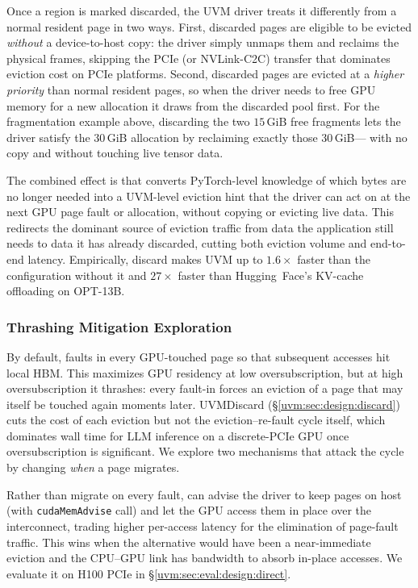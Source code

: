 Once a region is marked discarded,
    the UVM driver treats it differently from a normal resident page in two ways.
First, discarded pages are eligible to be evicted
    \emph{without} a device-to-host copy:
    the driver simply unmaps them and reclaims the physical frames,
    skipping the PCIe (or NVLink-C2C) transfer that dominates
    eviction cost on PCIe platforms.
Second, discarded pages are evicted at a \emph{higher priority}
    than normal resident pages,
    so when the driver needs to free GPU memory for a new allocation
    it draws from the discarded pool first.
For the fragmentation example above,
    discarding the two $15$\,GiB free fragments lets the driver
    satisfy the $30$\,GiB allocation by reclaiming exactly those $30$\,GiB---%
    with no copy and without touching live tensor data.

The combined effect is that {\uvmname} converts
    PyTorch-level knowledge of which bytes are no longer needed
    into a UVM-level eviction hint that the driver can act on
    at the next GPU page fault or allocation,
    without copying or evicting live data.
This redirects the dominant source of eviction traffic
    from data the application still needs
    to data it has already discarded,
    cutting both eviction volume and end-to-end latency.
Empirically, discard makes UVM up to 
    $1.6\times$ faster than the {\uvmname} configuration without it
    and $27\times$ faster than Hugging~Face's KV-cache offloading on OPT-13B.

\subsubsection{Thrashing Mitigation Exploration}
\label{uvm:sec:design:thrash}
By default, {\uvmname} faults in every GPU-touched page so that subsequent accesses hit local HBM.
This maximizes GPU residency at low oversubscription,
    but at high oversubscription it thrashes:
    every fault-in forces an eviction of a page that may itself be touched again moments later.
UVMDiscard (\S\ref{uvm:sec:design:discard}) cuts the cost of each eviction
    but not the eviction--re-fault cycle itself,
    which dominates wall time for LLM inference on a discrete-PCIe GPU once oversubscription is significant.
We explore two mechanisms that attack the cycle by changing \emph{when} a page migrates.

Rather than migrate on every fault,
    {\uvmname} can advise the driver to keep pages on host
    (with \texttt{cudaMemAdvise} call)
    and let the GPU access them in place over the interconnect,
    trading higher per-access latency for the elimination of page-fault traffic.
This wins when the alternative would have been a near-immediate eviction
    and the CPU--GPU link has bandwidth to absorb in-place accesses.
We evaluate it on H100 PCIe in \S\ref{uvm:sec:eval:design:direct}.

